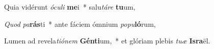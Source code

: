 \item Quia vidérunt \textit{ó}\textit{cu}\textit{li} \textbf{me}i~* salu\textit{tá}\textit{re} \textbf{tu}um,
\item \textit{Quod} \textit{pa}\textbf{rás}ti~* ante fáciem ómnium \textit{po}\textit{pu}\textbf{ló}rum,
\item Lumen ad revela\textit{ti}\textit{ó}\textit{nem} \textbf{Gén}\textbf{ti}um,~* et glóriam plebis \textit{tu}\textit{æ} \textbf{Is}\textbf{ra}ël.
